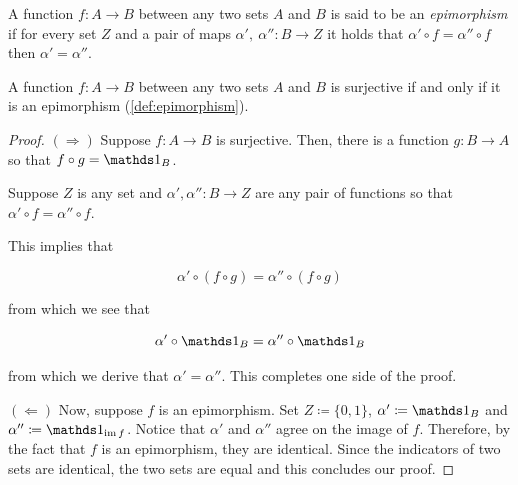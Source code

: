 \documentclass{article}
\begin{document}
\begin{definition}\label{def:epimorphism}
  A function \(f: A\to B\) between any two sets \(A\) and \(B\) is said to be an 
  \emph{epimorphism} if for every set \(Z\) and a pair of maps 
  \(\alpha',~\alpha'': B \to Z\) it holds that 
  \(\alpha' \circ f = \alpha'' \circ f\) then \(\alpha' = \alpha''\).
\end{definition}
\begin{ex}\cite[Ex-2.5]{aluffi_algebra_2009}
  A function \(f: A \to B\) between any two sets \(A\) and \(B\) is surjective if and 
  only if it is an epimorphism (\ref{def:epimorphism}).
\end{ex}
\begin{proof}
  \((\Longrightarrow)\) Suppose \(f: A\to B\) is surjective. Then, there is a function 
  \(g: B \to A\) so that \(f \circ g = \one_{B}\).

  Suppose \(Z\) is any set and \(\alpha',\alpha'' \colon B \to Z\) are any pair of 
  functions so that \(\alpha' \circ f = \alpha'' \circ f\).

  This implies that 

  \[
    \alpha' \circ (f \circ g) = \alpha'' \circ (f \circ g)
  \]

  from which we see that 

  \[
    \alpha' \circ \one_{B} = \alpha'' \circ \one_{B}
  \]

  from which we derive that \(\alpha' = \alpha''\). This completes one side of the proof. 

  \((\Longleftarrow)\)
  Now, suppose \(f\) is an epimorphism. Set \(Z \coloneqq \{0,1\}\), \(\alpha' \coloneqq \one_{B}\) 
  and \(\alpha'' \coloneqq \one_{\image f}\).
  Notice that \(\alpha'\) and \(\alpha''\) agree on the image of \(f\). Therefore, by the 
  fact that \(f\) is an epimorphism, they are identical. Since the indicators of two sets 
  are identical, the two sets are equal and this concludes our proof.
\end{proof}
\end{document}
